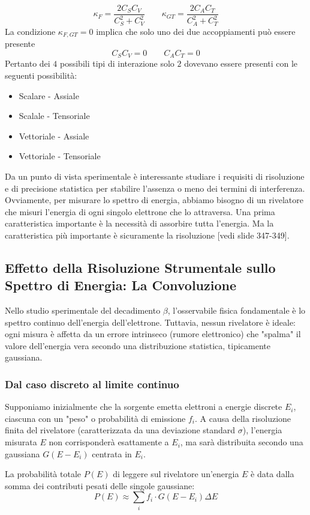$$
\kappa_F=\frac{2C_SC_V}{C_S^2+C_V^2} \qquad \kappa_{GT}=\frac{2C_AC_T}{C_A^2+C_T^2}
$$
La condizione $\kappa_{F,GT}=0$ implica che solo uno dei due accoppiamenti può essere presente
$$
C_SC_V=0\qquad C_AC_T=0
$$
Pertanto dei $4$ possibili tipi di interazione solo $2$ dovevano essere presenti con le seguenti possibilità:
\begin{itemize}
	\item Scalare - Assiale
	\item Scalale - Tensoriale
	\item Vettoriale - Assiale
	\item Vettoriale - Tensoriale
\end{itemize}
Da un punto di vista sperimentale è interessante studiare i requisiti di risoluzione e di precisione statistica per stabilire l'assenza o meno dei termini di interferenza. Ovviamente, per misurare lo spettro di energia, abbiamo bisogno di un rivelatore che misuri l'energia di ogni singolo elettrone che lo attraversa. Una prima caratteristica importante è la necessità di assorbire tutta l'energia. Ma la caratteristica più importante è sicuramente la risoluzione [vedi slide 347-349].
\subsection*{Effetto della Risoluzione Strumentale sullo Spettro di Energia: La Convoluzione}

Nello studio sperimentale del decadimento $\beta$, l'osservabile fisica fondamentale è lo spettro continuo dell'energia dell'elettrone. Tuttavia, nessun rivelatore è ideale: ogni misura è affetta da un errore intrinseco (rumore elettronico) che "spalma" il valore dell'energia vera secondo una distribuzione statistica, tipicamente gaussiana. 

\subsubsection*{Dal caso discreto al limite continuo}
Supponiamo inizialmente che la sorgente emetta elettroni a energie discrete $E_i$, ciascuna con un "peso" o probabilità di emissione $f_i$. A causa della risoluzione finita del rivelatore (caratterizzata da una deviazione standard $\sigma$), l'energia misurata $E$ non corrisponderà esattamente a $E_i$, ma sarà distribuita secondo una gaussiana $G(E - E_i)$ centrata in $E_i$.

La probabilità totale $P(E)$ di leggere sul rivelatore un'energia $E$ è data dalla somma dei contributi pesati delle singole gaussiane:
\begin{equation}
	P(E) \approx \sum_i f_i \cdot G(E - E_i) \Delta E
\end{equation}

